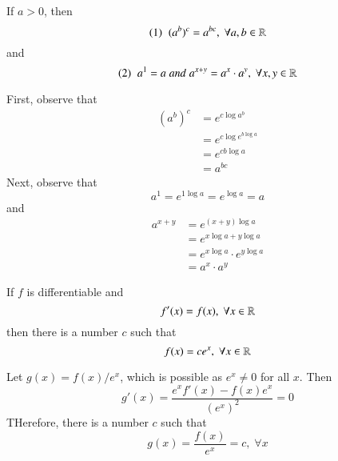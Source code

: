 \documentclass[12pt]{report}
\begin{document}
\begin{subappendices}
    \begin{thm}{}{}
        If $a > 0$, then \begin{equation*}
            (1)\;\;(a^b)^c = a^{bc},\;\forall a,b\in\mathbb R
        \end{equation*}
        and \begin{equation*}
            (2)\;\;a^1=a\;and\;a^{x+y}=a^x\cdot a^y,\;\forall x,y\in\mathbb R
        \end{equation*}
    \end{thm}
    \begin{proof*}{}{}
        First, observe that \begin{align*}
            (a^b)^c &= e^{c\log a^b} \\
            &= e^{c\log e^{b\log a}} \\
            &= e^{cb\log a} \\
            &= a^{bc}
        \end{align*}
        Next, observe that \begin{equation*}
            a^1 = e^{1\log a} = e^{\log a} = a
        \end{equation*}
        and \begin{align*}
            a^{x+y} &= e^{(x+y)\log a} \\
            &= e^{x\log a + y\log a} \\
            &= e^{x\log a} \cdot e^{y\log a} \\
            &= a^x \cdot a^y
        \end{align*}
    \end{proof*}

    \begin{thm}{}{}
        If $f$ is differentiable and \begin{equation*}
            f'(x) = f(x),\;\forall x\in\mathbb R
        \end{equation*}
        then there is a number $c$ such that \begin{equation*}
            f(x) = ce^x,\;\forall x\in\mathbb R
        \end{equation*}
    \end{thm}
    \begin{proof*}{}{}
        Let $g(x) = f(x)/e^x$, which is possible as $e^x \neq 0$ for all $x$. Then \begin{equation*}
            g'(x) = \frac{e^xf'(x) - f(x)e^x}{(e^x)^2} = 0
        \end{equation*}
        THerefore, there is a number $c$ such that \begin{equation*}
            g(x) = \frac{f(x)}{e^x} = c,\;\forall x
        \end{equation*}
    \end{proof*}
    


\end{subappendices}
\end{document}

